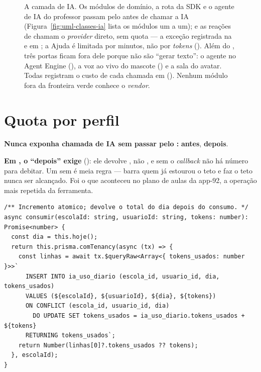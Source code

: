 \begin{figure}[H]
{\begin{tikzpicture}
\end{tikzpicture}}
\caption[Camada de IA]{A camada de IA. Os módulos de domínio, a rota da SDK e
  o agente de IA do professor passam pelo  antes de chamar a
  IA (Figura~\ref{fig:uml-classes-ia} lista os módulos um a um);
   e as reações de  chamam o \emph{provider} direto,
  sem quota --- a exceção registrada na  e em
  ; a Ajuda é limitada por minutos, não por \emph{tokens}
  (). Além do , três portas ficam fora dele
  porque não são \enquote{gerar texto}: o agente no Agent Engine
  (), a voz ao vivo do mascote () e a sala do
  avatar. Todas registram o custo de cada chamada em 
  (). Nenhum módulo fora da fronteira verde conhece o
  \emph{vendor}.}
\label{fig:camada-ia}
\end{figure}

\section{Quota por perfil}

\begin{regra}
\textbf{Nunca exponha chamada de IA sem passar pelo :}
 \textbf{antes},  \textbf{depois}.

\textbf{Em , o \enquote{depois} exige }
(): ele devolve , não , e sem o \emph{callback}
não há número para debitar. Um  sem  é meia
regra --- barra quem já estourou o teto e faz o teto nunca ser alcançado. Foi
o que aconteceu no plano de aulas da app-92, a operação mais repetida da
ferramenta.
\end{regra}

\begin{lstlisting}[language=tsunoo, caption={Incremento atômico da quota (\arq{src/ai/quota.service.ts})}, label={lst:quota}]
/** Incremento atomico; devolve o total do dia depois do consumo. */
async consumir(escolaId: string, usuarioId: string, tokens: number): Promise<number> {
  const dia = this.hoje();
  return this.prisma.comTenancy(async (tx) => {
    const linhas = await tx.$queryRaw<Array<{ tokens_usados: number }>>`
      INSERT INTO ia_uso_diario (escola_id, usuario_id, dia, tokens_usados)
      VALUES (${escolaId}, ${usuarioId}, ${dia}, ${tokens})
      ON CONFLICT (escola_id, usuario_id, dia)
        DO UPDATE SET tokens_usados = ia_uso_diario.tokens_usados + ${tokens}
      RETURNING tokens_usados`;
    return Number(linhas[0]?.tokens_usados ?? tokens);
  }, escolaId);
}
\end{lstlisting}


